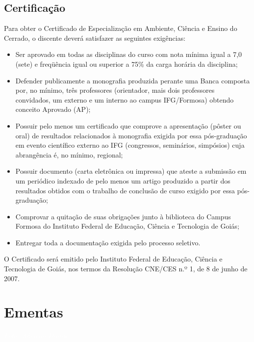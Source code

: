 \documentclass[11pt,fleqn]{book} %
\begin{document}

\section{Certificação}

Para obter o Certificado de Especialização em Ambiente, Ciência e Ensino do Cerrado, o discente deverá satisfazer as seguintes exigências:
\begin{itemize}
	\item Ser aprovado em todas as disciplinas do curso com nota mínima igual a 7,0 (sete) e freqüência igual ou superior a 75\% da carga horária da disciplina;
	\item Defender publicamente a monografia produzida perante uma Banca composta por, no mínimo, três professores (orientador, mais dois professores convidados, um externo e um interno ao campus IFG/Formosa) obtendo conceito Aprovado (AP);
	\item Possuir pelo menos um certificado que comprove a apresentação (pôster ou oral) de resultados relacionados à monografia exigida por essa pós-graduação em evento científico externo ao IFG (congressos, seminários, simpósios) cuja abrangência é, no mínimo, regional;
	\item Possuir documento (carta eletrônica ou impressa) que ateste a submissão em um periódico indexado de pelo menos um artigo produzido a partir dos resultados obtidos com o trabalho de conclusão de curso exigido por essa pós-graduação;
	\item Comprovar a quitação de suas obrigações junto à biblioteca do Campus Formosa do Instituto Federal de Educação, Ciência e Tecnologia de Goiás;
	\item Entregar toda a documentação exigida pelo processo seletivo.
\end{itemize}

O Certificado será emitido pelo Instituto Federal de Educação, Ciência e Tecnologia de Goiás, nos termos da Resolução CNE/CES n.º 1, de 8 de junho de 2007.	


\chapter{Ementas}
\vspace{6em}
\begin{flushright}
	\textit{\textcolor{white}{Foto: Adriano Darosci}}
\end{flushright}
\vspace{12em}
\end{document}

